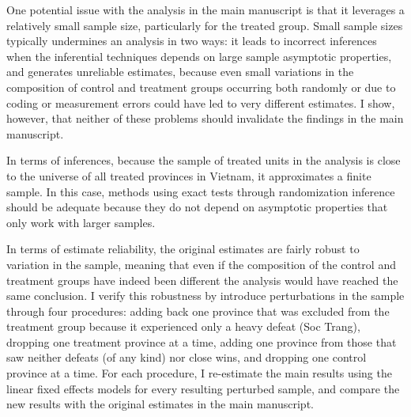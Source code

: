 \documentclass[12pt]{article}
\newcommand{\1}{\mathbbm{1}}
\begin{document}
One potential issue with the analysis in the main manuscript is that it leverages a relatively small sample size, particularly for the treated group. Small sample sizes typically undermines an analysis in two ways: it leads to incorrect inferences when the inferential techniques depends on large sample asymptotic properties, and generates unreliable estimates, because even small variations in the composition of control and treatment groups occurring both randomly or due to coding or measurement errors could have led to very different estimates. I show, however, that neither of these problems should invalidate the findings in the main manuscript.

In terms of inferences, because the sample of treated units in the analysis is close to the universe of all treated provinces in Vietnam, it approximates a finite sample. In this case, methods using exact tests through randomization inference should be adequate because they do not depend on asymptotic properties that only work with larger samples.

In terms of estimate reliability, the original estimates are fairly robust to variation in the sample, meaning that even if the composition of the control and treatment groups have indeed been different the analysis would have reached the same conclusion. I verify this robustness by introduce perturbations in the sample through four procedures: adding back one province that was excluded from the treatment group because it experienced only a heavy defeat (Soc Trang), dropping one treatment province at a time, adding one province from those that saw neither defeats (of any kind) nor close wins, and dropping one control province at a time. For each procedure, I re-estimate the main results using the linear fixed effects models for every resulting perturbed sample, and compare the new results with the original estimates in the main manuscript.
\end{document}
